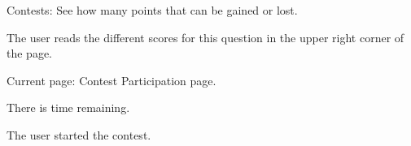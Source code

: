 \begin{uc}{Contests: See how many points that can be gained or lost.}

    \begin{uc-mss}
    \item The user reads the different scores for this question in the upper right corner of the page.
    \end{uc-mss}

    \begin{uc-pre}
    \item Current page: Contest Participation page.
    \item There is time remaining.
    \end{uc-pre}

    \begin{uc-trig}
    The user started the contest.
    \end{uc-trig}

\end{uc}
